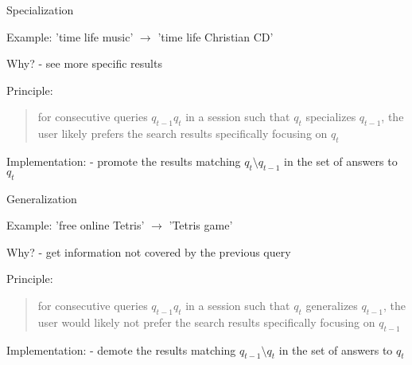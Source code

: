 \begin{frame}{Specialization}

Example: \newline
'time life music' $ \rightarrow $ 'time life Christian CD' \newline

Why? \newline
- see more specific results \newline

Principle:
\begin{quotation}
for consecutive queries $ q_{t-1}q_{t} $ in a session such that $ q_{t} $ specializes $ q_{t-1} $, the user likely prefers the search results specifically focusing on $ q_{t} $
\end{quotation}

Implementation: \newline
- promote the results matching $ q_{t} \setminus q_{t-1} $ in the set of answers to $ q_{t} $

\end{frame}


\begin{frame}{Generalization}

Example: \newline
'free online Tetris' $ \rightarrow $ 'Tetris game' \newline

Why? \newline
- get information not covered by the previous query \newline

Principle:
\begin{quotation}
for consecutive queries $ q_{t-1}q_{t} $ in a session such that $ q_{t} $ generalizes $ q_{t-1} $, the user would likely not prefer the search results specifically focusing on $ q_{t-1} $
\end{quotation}

Implementation: \newline
- demote the results matching $ q_{t-1} \setminus q_{t} $ in the set of answers to $ q_{t} $

\end{frame}


